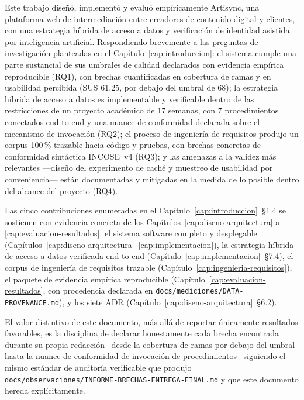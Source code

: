 Este trabajo diseñó, implementó y evaluó empíricamente Artisync, una
plataforma web de intermediación entre creadores de contenido digital y
clientes, con una estrategia híbrida de acceso a datos y verificación de
identidad asistida por inteligencia artificial. Respondiendo brevemente a
las preguntas de investigación planteadas en el
Capítulo~\ref{cap:introduccion}: el sistema cumple una parte sustancial de
sus umbrales de calidad declarados con evidencia empírica reproducible
(RQ1), con brechas cuantificadas en cobertura de ramas y en usabilidad
percibida (SUS 61.25, por debajo del umbral de 68); la estrategia híbrida
de acceso a datos es implementable y verificable dentro de las
restricciones de un proyecto académico de 17 semanas, con 7
procedimientos conectados end-to-end y una nuance de conformidad
declarada sobre el mecanismo de invocación (RQ2); el proceso de
ingeniería de requisitos produjo un corpus 100\,\% trazable hacia código
y pruebas, con brechas concretas de conformidad sintáctica INCOSE~v4
(RQ3); y las amenazas a la validez más relevantes ---diseño del
experimento de caché y muestreo de usabilidad por conveniencia--- están
documentadas y mitigadas en la medida de lo posible dentro del alcance
del proyecto (RQ4).

Las cinco contribuciones enumeradas en el
Capítulo~\ref{cap:introduccion}~\S1.4 se sostienen con evidencia concreta
de los Capítulos~\ref{cap:diseno-arquitectura} a
\ref{cap:evaluacion-resultados}: el sistema software completo y
desplegable (Capítulos~\ref{cap:diseno-arquitectura}--\ref{cap:implementacion}),
la estrategia híbrida de acceso a datos verificada end-to-end
(Capítulo~\ref{cap:implementacion}~\S7.4), el corpus de ingeniería de
requisitos trazable (Capítulo~\ref{cap:ingenieria-requisitos}), el
paquete de evidencia empírica reproducible
(Capítulo~\ref{cap:evaluacion-resultados}, con procedencia declarada en
\texttt{docs/mediciones/DATA-PROVENANCE.md}), y los siete ADR
(Capítulo~\ref{cap:diseno-arquitectura}~\S6.2).

El valor distintivo de este documento, más allá de reportar únicamente
resultados favorables, es la disciplina de declarar honestamente cada
brecha encontrada durante su propia redacción --desde la cobertura de
ramas por debajo del umbral hasta la nuance de conformidad de invocación
de procedimientos-- siguiendo el mismo estándar de auditoría verificable
que produjo \texttt{docs/observaciones/INFORME-BRECHAS-ENTREGA-FINAL.md} y
que este documento hereda explícitamente.
